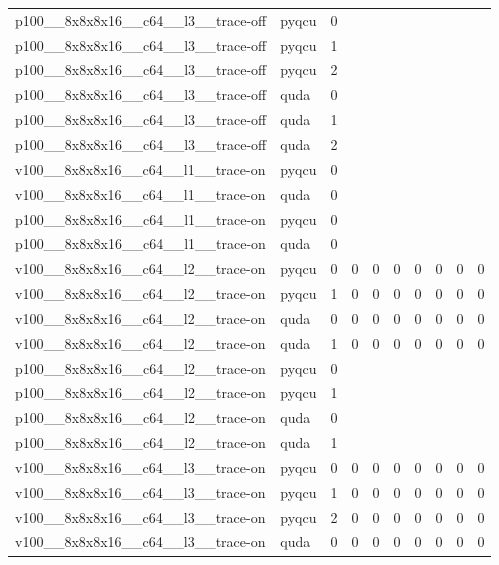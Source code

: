 \begin{table}[htbp]
\begin{tabular}{@{}llrrrrrrrr@{}}
p100\_\_8x8x8x16\_\_c64\_\_l3\_\_trace-off & pyqcu & 0 &  &  &  &  &  &  &  \\
p100\_\_8x8x8x16\_\_c64\_\_l3\_\_trace-off & pyqcu & 1 &  &  &  &  &  &  &  \\
p100\_\_8x8x8x16\_\_c64\_\_l3\_\_trace-off & pyqcu & 2 &  &  &  &  &  &  &  \\
p100\_\_8x8x8x16\_\_c64\_\_l3\_\_trace-off & quda & 0 &  &  &  &  &  &  &  \\
p100\_\_8x8x8x16\_\_c64\_\_l3\_\_trace-off & quda & 1 &  &  &  &  &  &  &  \\
p100\_\_8x8x8x16\_\_c64\_\_l3\_\_trace-off & quda & 2 &  &  &  &  &  &  &  \\
v100\_\_8x8x8x16\_\_c64\_\_l1\_\_trace-on & pyqcu & 0 &  &  &  &  &  &  &  \\
v100\_\_8x8x8x16\_\_c64\_\_l1\_\_trace-on & quda & 0 &  &  &  &  &  &  &  \\
p100\_\_8x8x8x16\_\_c64\_\_l1\_\_trace-on & pyqcu & 0 &  &  &  &  &  &  &  \\
p100\_\_8x8x8x16\_\_c64\_\_l1\_\_trace-on & quda & 0 &  &  &  &  &  &  &  \\
v100\_\_8x8x8x16\_\_c64\_\_l2\_\_trace-on & pyqcu & 0 & 0 & 0 & 0 & 0 & 0 & 0 & 0 \\
v100\_\_8x8x8x16\_\_c64\_\_l2\_\_trace-on & pyqcu & 1 & 0 & 0 & 0 & 0 & 0 & 0 & 0 \\
v100\_\_8x8x8x16\_\_c64\_\_l2\_\_trace-on & quda & 0 & 0 & 0 & 0 & 0 & 0 & 0 & 0 \\
v100\_\_8x8x8x16\_\_c64\_\_l2\_\_trace-on & quda & 1 & 0 & 0 & 0 & 0 & 0 & 0 & 0 \\
p100\_\_8x8x8x16\_\_c64\_\_l2\_\_trace-on & pyqcu & 0 &  &  &  &  &  &  &  \\
p100\_\_8x8x8x16\_\_c64\_\_l2\_\_trace-on & pyqcu & 1 &  &  &  &  &  &  &  \\
p100\_\_8x8x8x16\_\_c64\_\_l2\_\_trace-on & quda & 0 &  &  &  &  &  &  &  \\
p100\_\_8x8x8x16\_\_c64\_\_l2\_\_trace-on & quda & 1 &  &  &  &  &  &  &  \\
v100\_\_8x8x8x16\_\_c64\_\_l3\_\_trace-on & pyqcu & 0 & 0 & 0 & 0 & 0 & 0 & 0 & 0 \\
v100\_\_8x8x8x16\_\_c64\_\_l3\_\_trace-on & pyqcu & 1 & 0 & 0 & 0 & 0 & 0 & 0 & 0 \\
v100\_\_8x8x8x16\_\_c64\_\_l3\_\_trace-on & pyqcu & 2 & 0 & 0 & 0 & 0 & 0 & 0 & 0 \\
v100\_\_8x8x8x16\_\_c64\_\_l3\_\_trace-on & quda & 0 & 0 & 0 & 0 & 0 & 0 & 0 & 0 \\

\end{tabular}
\end{table}
